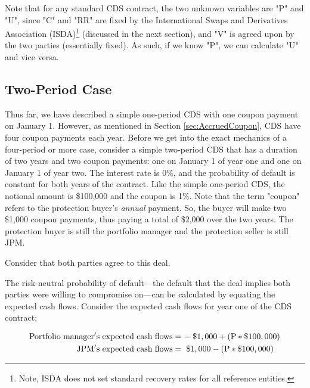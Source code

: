 \documentclass[article]{jss}
\begin{document}
Note that for any standard CDS contract, the two unknown variables are "P" and "U", since "C" and "RR" are fixed by the International Swaps and Derivatives Association (ISDA)\footnote{Note, ISDA does not set standard recovery rates for all reference entities.} (discussed in the next section), and "V" is agreed upon by the two parties (essentially fixed). As such, if we know "P", we can calculate "U" and vice versa.

\subsection{Two-Period Case}
\label{sec:TwoPeriod}


Thus far, we have described a simple one-period CDS with one coupon payment on January 1. However, as mentioned in Section \ref{sec:AccruedCoupon}, CDS have four coupon payments each year. Before we get into the exact mechanics of a four-period or more case, consider a simple two-period CDS that has a duration of two years and 
two coupon payments: one on January 1 of year one and one on January 1 of year two. The interest rate is 0\%, and the probability of default is constant for both years of the contract. Like the simple one-period CDS, the notional amount is \$100,000 and the coupon is 1\%. Note that the term "coupon" refers to the protection buyer's \emph{annual} payment. So, the buyer will make two \$1,000 coupon payments, thus paying a total of \$2,000 over the two years. The protection buyer is still the portfolio manager and the protection seller is still JPM. 

Consider that both parties agree to this deal. 

The risk-neutral probability of default---the default that the deal implies both parties were willing to compromise on---can be calculated by equating the expected cash flows. Consider the expected cash flows for year one of the CDS contract:

\begin{align}
  \rm Portfolio\hspace{3pt}manager's\hspace{3pt}expected\hspace{3pt}cash\hspace{3pt}flows &= \rm -\hspace{3pt}\$1,000 + (P * {\$100,000}) \\
  \rm JPM's\hspace{3pt}expected\hspace{3pt}cash\hspace{3pt}flows &= \rm \hspace{3pt}\$1,000 - (P * {\$100,000})
\end{align}
\end{document}
